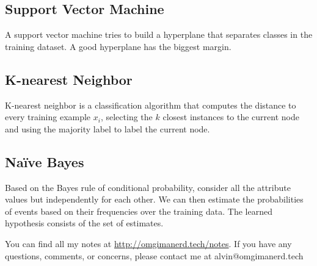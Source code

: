 \documentclass{math}
\begin{document}
\subsection*{Support Vector Machine}
A support vector machine tries to build a hyperplane that separates classes in
the training dataset. A good hyperplane has the biggest margin.

\subsection*{K-nearest Neighbor}
K-nearest neighbor is a classification algorithm that computes the distance to
every training example \( x_i \), selecting the \( k \) closest instances to the
current node and using the majority label to label the current node.

\subsection*{Na\"ive Bayes}
Based on the Bayes rule of conditional probability, consider all the attribute
values but independently for each other. We can then estimate the probabilities
of events based on their frequencies over the training data. The learned
hypothesis consists of the set of estimates.

\begin{center}
  You can find all my notes at \url{http://omgimanerd.tech/notes}. If you have
  any questions, comments, or concerns, please contact me at
  alvin@omgimanerd.tech
\end{center}
\end{document}

